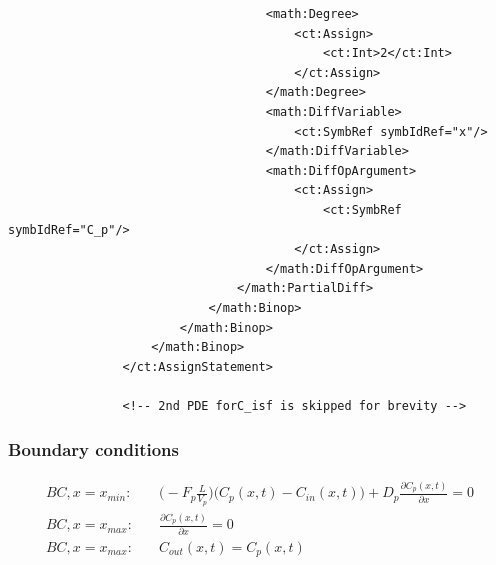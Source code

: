 \begin{lstlisting}
                                    <math:Degree>
                                        <ct:Assign>
                                            <ct:Int>2</ct:Int>
                                        </ct:Assign>
                                    </math:Degree>
                                    <math:DiffVariable>
                                        <ct:SymbRef symbIdRef="x"/>
                                    </math:DiffVariable>
                                    <math:DiffOpArgument>
                                        <ct:Assign>
                                            <ct:SymbRef symbIdRef="C_p"/>
                                        </ct:Assign>
                                    </math:DiffOpArgument>
                                </math:PartialDiff>
                            </math:Binop>
                        </math:Binop>
                    </math:Binop>
                </ct:AssignStatement>
                
                <!-- 2nd PDE forC_isf is skipped for brevity -->
\end{lstlisting}


\subsubsection*{Boundary conditions}


\begin{align}
BC, x=x_{min}: \quad & \Big(-F_p \frac{L}{V_p}\Big)\big(C_p(x,t) - C_{in}(x,t)\big) + D_p \frac{\partial C_p(x,t)}{\partial x} = 0 \nonumber \\
BC, x=x_{max}: \quad & \frac{\partial C_p(x,t)}{\partial x} = 0 \nonumber \\
BC, x=x_{max}: \quad & C_{out}(x,t) = C_p(x,t) \nonumber
\end{align}

